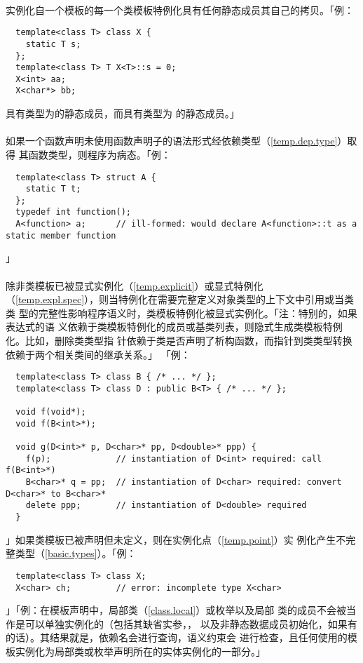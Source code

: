 \paragraph{}
实例化自一个模板的每一个类模板特例化具有任何静态成员其自己的拷贝。「例：
\begin{lstlisting}
  template<class T> class X {
    static T s;
  };
  template<class T> T X<T>::s = 0;
  X<int> aa;
  X<char*> bb;
\end{lstlisting}
具有类型为的静态成员，而具有类型为
的静态成员。」

\paragraph{}
如果一个函数声明未使用函数声明子的语法形式经依赖类型（\ref{temp.dep.type}）取得
其函数类型，则程序为病态。「例：
\begin{lstlisting}
  template<class T> struct A {
    static T t;
  };
  typedef int function();
  A<function> a;      // ill-formed: would declare A<function>::t as a static member function
\end{lstlisting}」

\paragraph{}
除非类模板已被显式实例化（\ref{temp.explicit}）或显式特例化
（\ref{temp.expl.spec}），则当特例化在需要完整定义对象类型的上下文中引用或当类类
型的完整性影响程序语义时，类模板特例化被显式实例化。「注：特别的，如果表达式的语
义依赖于类模板特例化的成员或基类列表，则隐式生成类模板特例化。比如，删除类类型指
针依赖于类是否声明了析构函数，而指针到类类型转换依赖于两个相关类间的继承关系。」
「例：
\begin{lstlisting}
  template<class T> class B { /* ... */ };
  template<class T> class D : public B<T> { /* ... */ };

  void f(void*);
  void f(B<int>*);

  void g(D<int>* p, D<char>* pp, D<double>* ppp) {
    f(p);             // instantiation of D<int> required: call f(B<int>*)
    B<char>* q = pp;  // instantiation of D<char> required: convert D<char>* to B<char>*
    delete ppp;       // instantiation of D<double> required
  }
\end{lstlisting}」如果类模板已被声明但未定义，则在实例化点（\ref{temp.point}）实
例化产生不完整类型（\ref{basic.types}）。「例：
\begin{lstlisting}
  template<class T> class X;
  X<char> ch;         // error: incomplete type X<char>
\end{lstlisting}」「例：在模板声明中，局部类（\ref{class.local}）或枚举以及局部
类的成员不会被当作是可以单独实例化的（包括其缺省实参，，
以及非静态数据成员初始化，如果有的话）。其结果就是，依赖名会进行查询，语义约束会
进行检查，且任何使用的模板实例化为局部类或枚举声明所在的实体实例化的一部分。」

